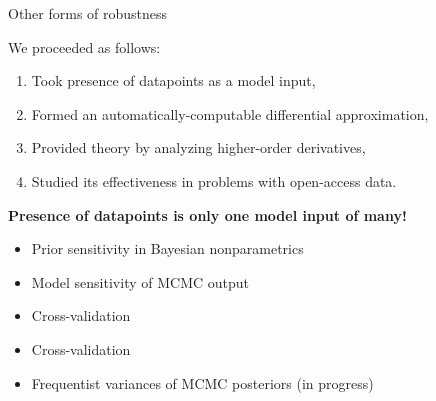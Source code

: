 
\begin{frame}[t]{Other forms of robustness}

We proceeded as follows:
\begin{enumerate}
    \item Took presence of datapoints as a model input,
    \item Formed an automatically-computable differential approximation,
    \item Provided theory by analyzing higher-order derivatives,
    \item Studied its effectiveness in problems with open-access data.
\end{enumerate}

\vspace{1em}
\textbf{Presence of datapoints is only one model input of many!}

\vspace{1em}
\begin{itemize}
    \item Prior sensitivity in Bayesian nonparametrics \citep{giordano2021bnp}
    \item Model sensitivity of MCMC output
        \citep{gustafson2000local, giordano2018covariances}
    \item Cross-validation \citep{giordano2019swiss, wilson:2020:cv}
    \item Cross-validation \citep{giordano2019swiss, wilson:2020:cv}
    \item Frequentist variances of MCMC posteriors (in progress)
\end{itemize}

\end{frame}





